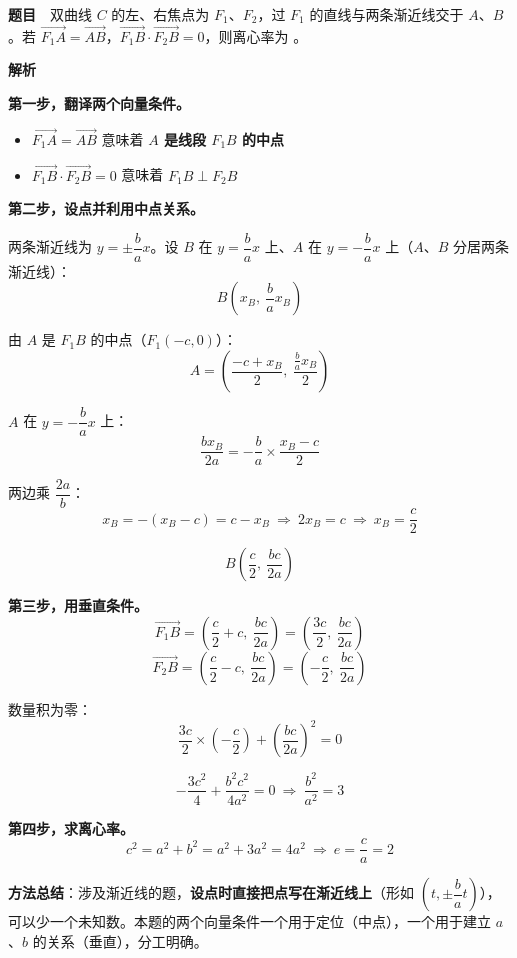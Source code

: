 \par\medskip


\textbf{题目}　双曲线 $C$ 的左、右焦点为 $F_1$、$F_2$，过 $F_1$ 的直线与两条渐近线交于 $A$、$B$。若 $\overrightarrow{F_1A}=\overrightarrow{AB}$，$\overrightarrow{F_1B}\cdot\overrightarrow{F_2B}=0$，则离心率为 \gkblank{}。

\textbf{解析}

\textbf{第一步，翻译两个向量条件。}

\begin{itemize}
\item $\overrightarrow{F_1A}=\overrightarrow{AB}$ 意味着 \textbf{$A$ 是线段 $F_1B$ 的中点}
\item $\overrightarrow{F_1B}\cdot\overrightarrow{F_2B}=0$ 意味着 \textbf{$F_1B\perp F_2B$}
\end{itemize}

\textbf{第二步，设点并利用中点关系。}

两条渐近线为 $y=\pm\dfrac ba x$。设 $B$ 在 $y=\dfrac ba x$ 上、$A$ 在 $y=-\dfrac ba x$ 上（$A$、$B$ 分居两条渐近线）：
\[B\left(x_B,\ \frac ba x_B\right)\]

由 $A$ 是 $F_1B$ 的中点（$F_1(-c,0)$）：
\[A=\left(\frac{-c+x_B}2,\ \frac{\frac ba x_B}2\right)\]

$A$ 在 $y=-\dfrac ba x$ 上：
\[\frac{b x_B}{2a}=-\frac ba\times\frac{x_B-c}2\]

两边乘 $\dfrac{2a}b$：
\[x_B=-(x_B-c)=c-x_B\ \Longrightarrow\ 2x_B=c\ \Longrightarrow\ x_B=\frac c2\]

\[B\left(\frac c2,\ \frac{bc}{2a}\right)\]

\textbf{第三步，用垂直条件。}
\[\overrightarrow{F_1B}=\left(\frac c2+c,\ \frac{bc}{2a}\right)=\left(\frac{3c}2,\ \frac{bc}{2a}\right)\]
\[\overrightarrow{F_2B}=\left(\frac c2-c,\ \frac{bc}{2a}\right)=\left(-\frac c2,\ \frac{bc}{2a}\right)\]

数量积为零：
\[\frac{3c}2\times\left(-\frac c2\right)+\left(\frac{bc}{2a}\right)^{2}=0\]

\[-\frac{3c^{2}}4+\frac{b^{2}c^{2}}{4a^{2}}=0\ \Longrightarrow\ \frac{b^{2}}{a^{2}}=3\]

\textbf{第四步，求离心率。}
\[c^{2}=a^{2}+b^{2}=a^{2}+3a^{2}=4a^{2}\ \Longrightarrow\ e=\frac ca=2\]


\begin{gktip}
\textbf{方法总结}：涉及渐近线的题，\textbf{设点时直接把点写在渐近线上}（形如 $\left(t,\pm\dfrac ba t\right)$），可以少一个未知数。本题的两个向量条件一个用于定位（中点），一个用于建立 $a$、$b$ 的关系（垂直），分工明确。
\end{gktip}

